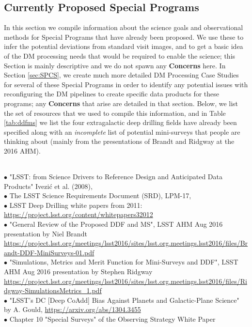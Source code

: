\documentclass[DM,lsstdraft,toc]{lsstdoc}
\begin{document}
\subsection{Currently Proposed Special Programs} \label{ssec:data_science}

In this section we compile information about the science goals and observational methods for Special Programs that have already been proposed. We use these to infer the potential deviations from standard visit images, and to get a basic idea of the DM processing needs that would be required to enable the science; this Section is mainly descriptive and we do not spawn any {\bf Concerns} here. In Section \ref{sec:SPCS}, we create much more detailed DM Processing Case Studies for several of these Special Programs in order to identify any potential issues with reconfiguring the DM pipelines to create specific data products for these programs; any {\bf Concerns} that arise are detailed in that section. Below, we list the set of resources that we used to compile this information, and in Table \ref{tab:ddfms} we list the four extragalactic deep drilling fields have already been specified along with an {\it incomplete} list of potential mini-surveys that people are thinking about (mainly from the presentations of Brandt and Ridgway at the 2016 AHM).

 \\
$\bullet$ "LSST: from Science Drivers to Reference Design and Anticipated Data Products" Ivezi\'{c} et al. (2008), \cite{2008arXiv0805.2366I} \\
$\bullet$ The LSST Science Requirements Document (SRD), LPM-17, \cite{LPM-17} \\
$\bullet$ LSST Deep Drilling white papers from 2011: \url{https://project.lsst.org/content/whitepapers32012} \\
$\bullet$ "General Review of the Proposed DDF and MS", LSST AHM Aug 2016 presentation by Niel Brandt \url{https://project.lsst.org/meetings/lsst2016/sites/lsst.org.meetings.lsst2016/files/Brandt-DDF-MiniSurveys-01.pdf} \\
$\bullet$ "Simulations, Metrics and Merit Function for Mini-Surveys and DDF", LSST AHM Aug 2016 presentation by Stephen Ridgway \url{https://project.lsst.org/meetings/lsst2016/sites/lsst.org.meetings.lsst2016/files/Ridgway-SimulationsMetrics_1.pdf} \\
$\bullet$ "LSST's DC [Deep CoAdd] Bias Against Planets and Galactic-Plane Science" by A. Gould, \cite{2013arXiv1304.3455G} \url{https://arxiv.org/abs/1304.3455} \\
$\bullet$ Chapter 10 "Special Surveys" of the Observing Strategy White Paper \cite{2017arXiv170804058L}
\end{document}
